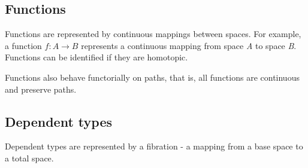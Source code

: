 \documentclass[12pt]{report}
\begin{document}
\subsection{Functions}
Functions are represented by continuous mappings between spaces. For example, a function $f : A \rightarrow B$ represents a continuous mapping from space \textit{A} to space \textit{B}. Functions can be identified if they are homotopic.

Functions also behave functorially on paths, that is, all functions are continuous and preserve paths.


\subsection{Dependent types}
Dependent types are represented by a fibration - a mapping from a base space to a total space.
\end{document}
